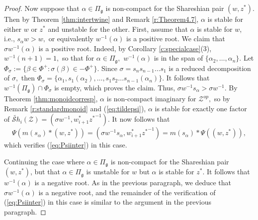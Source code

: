 \documentclass[12pt]{amsart}
\numberwithin{equation}{section}
\newcommand{\cZ}{{\mathcal Z}}
\newcommand{\fg}{\mbox{${\mathfrak g}$}}
\newcommand{\ms}{m(s_{\alpha})}
\newcommand{\Sh}{\mathcal{S}h}
\begin{document}
\begin{proof}
 
Now suppose that $\alpha\in\Pi_{\fg}$ is non-compact for the Shareshian pair $(w,z^{*})$.  Then by Theorem \ref{thm:intertwine} and Remark \ref{r:Theorem4.7}, $\alpha$ is stable for either $w$ or $z^{*}$ and unstable for the other.  First, assume that $\alpha$ is stable for $w$, i.e., $s_{\alpha}w>w,$ or equivalently $w^{-1}(\alpha)$ is a positive root.  We claim that $\sigma w^{-1}(\alpha)$ is a positive root.    Indeed, by Corollary \ref{c:specialcase}(3), $w^{-1}(n+1)=1,$ so that for $\alpha \in \Pi_{\fg},$ $w^{-1}(\alpha)$ is in the span of $\{ \alpha_2, \dots, \alpha_n \}.$  Let $\Phi_{\sigma}:= \{ \beta \in \Phi^+ : \sigma(\beta) \in -\Phi^+ \}.$   Since $\sigma = s_n s_{n-1} \dots s_1$ is a reduced decomposition of $\sigma,$  then $\Phi_{\sigma}= \{ \alpha_1, s_{1}(\alpha_2), \dots, s_{1} s_{2} \dots s_{n-1}(\alpha_n) \}.$  It follows that $w^{-1}(\Pi_{\fg})\cap \Phi_{\sigma}$ is empty, which proves the claim. Thus, $\sigma w^{-1} s_{\alpha} > \sigma w^{-1}.$   By Theorem \ref{thm:monoidcorresp}, $\alpha$ is non-compact imaginary for ${\cZ}^{op},$ so by Remark \ref{r:standardmonoid} and (\ref{eq:tildepsi}), $\alpha$ is stable for exactly one factor of $\widetilde{\Sh}_{i}(\cZ)=(\sigma w^{-1}, w_{i+1}^{*} {z^{*}}^{-1}).$  It now follows that
\begin{equation}
\Psi(\ms*(w,z^{*}))=(\sigma w^{-1} s_{\alpha}, w_{i+1}^{*}{z^{*}}^{-1})=\ms*\Psi((w,z^{*})),
\end{equation}
which verifies (\ref{eq:Psiinter}) in this case.

  
Continuing the case where $\alpha\in\Pi_{\fg}$ is non-compact for the Shareshian pair $(w,z^*)$, but that $\alpha\in\Pi_{\fg}$ is unstable for $w$ but $\alpha$ is stable for $z^{*}.$  It follows that $w^{-1}(\alpha)$ is a negative root.  As in the previous paragraph, we deduce that $\sigma w^{-1}(\alpha)$ is a negative root, and the remainder of the verification of (\ref{eq:Psiinter}) in this case is similar to the argument in the previous paragraph.


\end{proof}
\end{document}
